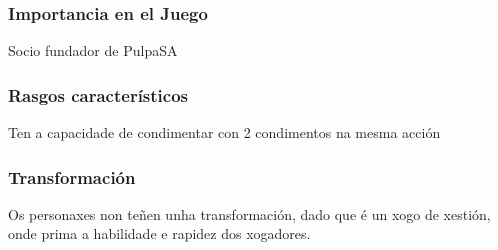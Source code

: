 \documentclass{report}  %
\begin{document}
\subsubsection{Importancia en el Juego}
Socio fundador de PulpaSA \footnotemark[1]
\subsubsection{Rasgos característicos}
Ten a capacidade de condimentar con 2 condimentos na mesma acción \footnotemark[2]
\subsubsection{Transformación}
Os personaxes non teñen unha transformación, dado que é un xogo de xestión, onde prima a habilidade e rapidez dos xogadores.

\end{document}
